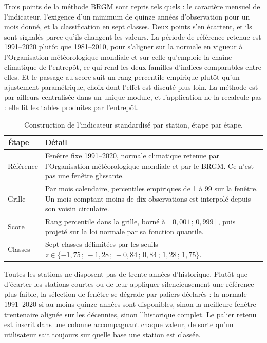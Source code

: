 Trois points de la méthode BRGM sont repris tels quels : le caractère mensuel de l'indicateur,
l'exigence d'un minimum de quinze années d'observation pour un mois donné, et la classification
en sept classes. Deux points s'en écartent, et ils sont signalés parce qu'ils changent les
valeurs. La période de référence retenue est 1991--2020 plutôt que 1981--2010, pour s'aligner sur
la normale en vigueur à l'Organisation météorologique mondiale et sur celle qu'emploie la chaîne
climatique de l'entrepôt, ce qui rend les deux familles d'indices comparables entre elles. Et le
passage au score suit un rang percentile empirique plutôt qu'un ajustement paramétrique, choix
dont l'effet est discuté plus loin. La méthode est par ailleurs centralisée dans un unique
module, et l'application ne la recalcule pas : elle lit les tables produites par l'entrepôt.

\begin{table}[H]
\centering
\caption{Construction de l'indicateur standardisé par station, étape par étape.}
\label{tab:ips-etapes}
\begin{tabularx}{\textwidth}{@{}lX@{}}
\toprule
\textbf{Étape} & \textbf{Détail} \\
\midrule
Référence & Fenêtre fixe 1991--2020, normale climatique retenue par l'Organisation
météorologique mondiale et par le BRGM. Ce n'est pas une fenêtre glissante. \\
Grille & Par mois calendaire, percentiles empiriques de 1 à 99 sur la fenêtre. Un mois comptant
moins de dix observations est interpolé depuis son voisin circulaire. \\
Score & Rang percentile dans la grille, borné à $[0{,}001\,;\,0{,}999]$, puis projeté sur la loi
normale par sa fonction quantile. \\
Classes & Sept classes délimitées par les seuils $z \in \{-1{,}75\,;\,-1{,}28\,;\,-0{,}84\,;\,
0{,}84\,;\,1{,}28\,;\,1{,}75\}$. \\
\bottomrule
\end{tabularx}
\end{table}

Toutes les stations ne disposent pas de trente années d'historique. Plutôt que d'écarter les stations courtes ou de leur appliquer
silencieusement une référence plus faible, la sélection de fenêtre se dégrade par paliers
déclarés : la normale 1991--2020 si au moins quinze années sont disponibles, sinon la meilleure
fenêtre trentenaire alignée sur les décennies, sinon l'historique complet. Le palier retenu est
inscrit dans une colonne accompagnant chaque valeur, de sorte qu'un utilisateur sait toujours
sur quelle base une station est classée.

